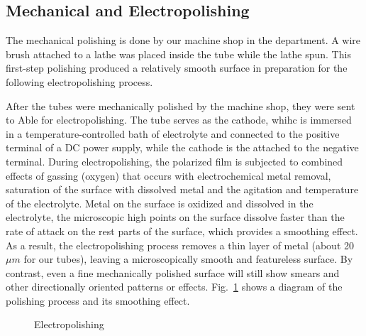 \subsection{Mechanical and Electropolishing}

The mechanical polishing is done by our machine shop in the department. A wire brush attached to a lathe was placed inside the tube while the lathe spun. This first-step polishing produced a relatively smooth surface in preparation for the following electropolishing process.

After the tubes were mechanically polished by the machine shop, they were sent to Able for electropolishing. The tube serves as the cathode, whihc is immersed in a temperature-controlled bath of electrolyte and connected to the positive terminal of a DC power supply, while the cathode is the attached to the negative terminal. During electropolishing, the polarized film is subjected to combined effects of gassing (oxygen) that occurs with electrochemical metal removal, saturation of the surface with dissolved metal and the agitation and temperature of the electrolyte. Metal on the surface is oxidized and dissolved in the electrolyte, the microscopic high points on the surface dissolve faster than the rate of attack on the rest parts of the surface, which provides a smoothing effect. As a result, the electropolishing process removes a thin layer of metal (about 20 $\mu m$ for our tubes), leaving a microscopically smooth and featureless surface. By contrast, even a fine mechanically polished surface will still show smears and other directionally oriented patterns or effects\cite{Electropolishing}. Fig.~\ref{Electropolishing} shows a diagram of the polishing process and its smoothing effect.

\begin{figure}[t!]
	\centering
	\caption{{Electropolishing~\cite{Electropolishing}}}
	\label{Electropolishing}
\end{figure}

